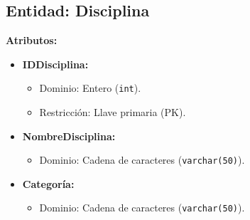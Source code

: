 \subsection*{Entidad: Disciplina}
\textbf{Atributos:}
\begin{itemize}
    \item \textbf{IDDisciplina:}
    \begin{itemize}
        \item Dominio: Entero (\texttt{int}).
        \item Restricción: Llave primaria (PK).
    \end{itemize}
    \item \textbf{NombreDisciplina:}
    \begin{itemize}
        \item Dominio: Cadena de caracteres (\texttt{varchar(50)}).
    \end{itemize}
    \item \textbf{Categoría:}
    \begin{itemize}
        \item Dominio: Cadena de caracteres (\texttt{varchar(50)}).
    \end{itemize}
\end{itemize}

